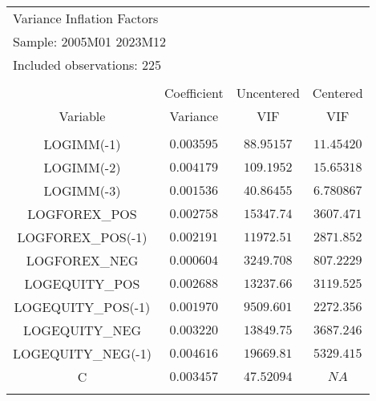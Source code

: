 \begin{tabular}{lrrr}
\multicolumn{2}{l}{Variance Inflation Factors}&\multicolumn{1}{c}{}&\multicolumn{1}{c}{}\\
\multicolumn{2}{l}{Sample: 2005M01 2023M12}&\multicolumn{1}{c}{}&\multicolumn{1}{c}{}\\
\multicolumn{2}{l}{Included observations: 225}&\multicolumn{1}{c}{}&\multicolumn{1}{c}{}\\
[4.5pt] \hline \\ [-4.5pt]
\multicolumn{1}{c}{}&\multicolumn{1}{c}{Coefficient}&\multicolumn{1}{c}{Uncentered}&\multicolumn{1}{c}{Centered}\\
\multicolumn{1}{c}{Variable}&\multicolumn{1}{c}{Variance}&\multicolumn{1}{c}{VIF}&\multicolumn{1}{c}{VIF}\\
[4.5pt] \hline \\ [-4.5pt]
\multicolumn{1}{c}{LOGIMM(-1)}&\multicolumn{1}{c}{$0.003595$}&\multicolumn{1}{c}{$88.95157$}&\multicolumn{1}{c}{$11.45420$}\\
\multicolumn{1}{c}{LOGIMM(-2)}&\multicolumn{1}{c}{$0.004179$}&\multicolumn{1}{c}{$109.1952$}&\multicolumn{1}{c}{$15.65318$}\\
\multicolumn{1}{c}{LOGIMM(-3)}&\multicolumn{1}{c}{$0.001536$}&\multicolumn{1}{c}{$40.86455$}&\multicolumn{1}{c}{$6.780867$}\\
\multicolumn{1}{c}{LOGFOREX\_POS}&\multicolumn{1}{c}{$0.002758$}&\multicolumn{1}{c}{$15347.74$}&\multicolumn{1}{c}{$3607.471$}\\
\multicolumn{1}{c}{LOGFOREX\_POS(-1)}&\multicolumn{1}{c}{$0.002191$}&\multicolumn{1}{c}{$11972.51$}&\multicolumn{1}{c}{$2871.852$}\\
\multicolumn{1}{c}{LOGFOREX\_NEG}&\multicolumn{1}{c}{$0.000604$}&\multicolumn{1}{c}{$3249.708$}&\multicolumn{1}{c}{$807.2229$}\\
\multicolumn{1}{c}{LOGEQUITY\_POS}&\multicolumn{1}{c}{$0.002688$}&\multicolumn{1}{c}{$13237.66$}&\multicolumn{1}{c}{$3119.525$}\\
\multicolumn{1}{c}{LOGEQUITY\_POS(-1)}&\multicolumn{1}{c}{$0.001970$}&\multicolumn{1}{c}{$9509.601$}&\multicolumn{1}{c}{$2272.356$}\\
\multicolumn{1}{c}{LOGEQUITY\_NEG}&\multicolumn{1}{c}{$0.003220$}&\multicolumn{1}{c}{$13849.75$}&\multicolumn{1}{c}{$3687.246$}\\
\multicolumn{1}{c}{LOGEQUITY\_NEG(-1)}&\multicolumn{1}{c}{$0.004616$}&\multicolumn{1}{c}{$19669.81$}&\multicolumn{1}{c}{$5329.415$}\\
\multicolumn{1}{c}{C}&\multicolumn{1}{c}{$0.003457$}&\multicolumn{1}{c}{$47.52094$}&\multicolumn{1}{c}{$NA$}\\
[4.5pt] \hline \\ [-4.5pt]
\end{tabular}